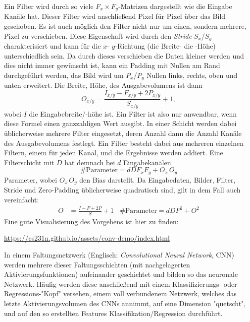 		Ein Filter wird durch so viele \( F_x \times F_y \)-Matrizen dargestellt wie die Eingabe Kanäle hat. Dieser Filter wird anschließend Pixel für Pixel über das Bild geschoben. Es ist auch möglich den Filter nicht nur um einen, sondern mehrere, Pixel zu verschieben. Diese Eigenschaft wird durch den \emph{Stride} \( S_x \)/\( S_y \) charakterisiert und kann für die \(x\)- \bzw \(y\)-Richtung (\dh die Breite- \bzw die -Höhe) unterschiedlich sein. Da durch dieses verschieben die Daten kleiner werden und dies nicht immer gewünscht ist, kann ein Padding mit Nullen am Rand durchgeführt werden, \dh das Bild wird um \(P_x\)/\(P_y\) Nullen links, rechts, oben und unten erweitert. Die Breite, \bzw Höhe, des Ausgabevolumens ist dann
		\begin{equation}
			O_{x/y} = \frac{I_{x/y} - F_{x/y} + 2P_{x/y}}{S_{x/y}} + 1,
		\end{equation}
		wobei \(I\) die Eingabebreite/-höhe ist. Ein Filter ist also nur anwendbar, wenn diese Formel einen ganzzahligen Wert ausgibt. In einer Schicht werden dabei üblicherweise mehrere Filter eingesetzt, deren Anzahl dann die Anzahl Kanäle des Ausgabevolumens festlegt. Ein Filter besteht dabei aus mehreren einzelnen Filtern, einem für jeden Kanal, und die Ergebnisse werden addiert. Eine Filterschicht mit \(D\) hat demnach bei \(d\) Eingabekanälen
		\begin{equation}
			\text{\#Parameter} = d D F_x F_y + O_x \, O_y
		\end{equation}
		Parameter, wobei \( O_x \, O_y \) den Bias darstellt. Da Eingabedaten, Bilder, Filter, Stride und Zero-Padding üblicherweise quadratisch sind, gilt in dem Fall auch vereinfacht:
		\begin{align}
			O &= \frac{I - F + 2P}{S} + 1 &
			\text{\#Parameter} = d D F^2 + O^2
		\end{align}
		Eine gute Visualisierung des Vorgehens ist hier zu finden:
		\begin{center}
			\url{https://cs231n.github.io/assets/conv-demo/index.html}
		\end{center}
		In einem Faltungsnetzwerk (Englisch: \emph{Convolutional Neural Network}, CNN) werden mehrere dieser Faltungsschichten (mit nachgelagerten Aktivierungsfunktionen) aufeinander geschichtet und bilden so das neuronale Netzwerk. Häufig werden diese anschließend mit einem Klassifizierungs- oder Regressions-"Kopf" versehen, \dh einem voll verbundenem Netzwerk, welches das letzte Aktivierungsvolumen des CNNs annimmt, auf eine Dimension "quetscht", und auf den so erstellten Features Klassifikation/Regression durchführt.

